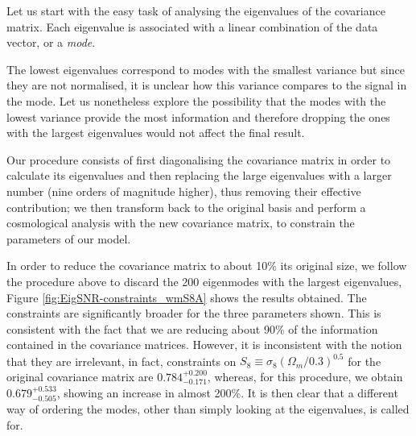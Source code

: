 \documentclass[twocolumn]{\docclass}
\newcommand{\rf}[1]{Figure \ref{fig:#1}}
\begin{document}
	Let us start with the easy task of analysing the eigenvalues of the covariance matrix. Each eigenvalue is associated with a linear combination of the data vector, or a \emph{mode}.%
	
	
	The lowest eigenvalues correspond to modes with the smallest variance but since they are not normalised, it is unclear how this variance compares to the signal in the mode. Let us nonetheless explore the possibility that the modes with the lowest variance provide the most information and therefore dropping the ones with the largest eigenvalues would not affect the final result.
	
	Our procedure consists of first diagonalising the covariance matrix in order to calculate its eigenvalues and then replacing the large eigenvalues with a larger number (nine orders of magnitude higher), thus removing their effective contribution; we then transform back to the original basis and perform a cosmological analysis with the new covariance matrix, to constrain the parameters of our model. 
	
	In order to reduce the covariance matrix to about 10\% its original size, we follow the procedure above to discard the 200 eigenmodes with the largest eigenvalues, \rf{EigSNR-constraints_wmS8A} shows the results obtained.  The constraints are significantly broader for the three parameters shown. This is consistent with the fact that we are reducing about 90\% of the information contained in the covariance matrices. However, it is inconsistent with the notion that they are irrelevant, in fact, constraints on $S_8\equiv \sigma_8 (\Omega_m/0.3)^{0.5}$ for the original covariance matrix are $0.784^{+ 0.200}_{- 0.171}$, whereas, for this procedure, we obtain $0.679^{+ 0.533}_{- 0.505}$, showing an increase in almost 200\%. It is then clear that a different way of ordering the modes, other than simply looking at the eigenvalues, is called for.	
	
\end{document}
